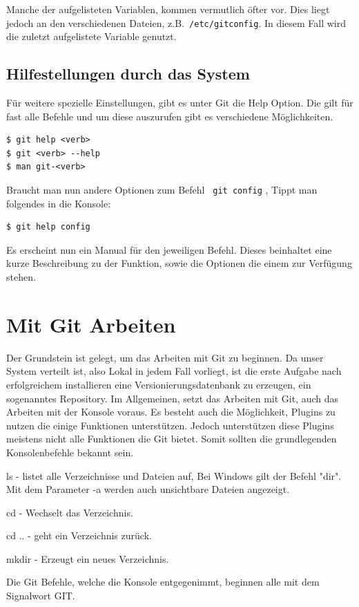 \documentclass[12pt,a4paper,bibliography=totocnumbered,listof=totocnumbered]{scrartcl}
\begin{document}
Manche der aufgelisteten Variablen, kommen vermutlich öfter vor. Dies liegt jedoch an den verschiedenen Dateien, z.B.\lstinline| /etc/gitconfig|. In diesem Fall wird die zuletzt aufgelistete Variable genutzt.

\subsection{Hilfestellungen durch das System}
Für weitere spezielle Einstellungen, gibt es unter Git die Help Option.
Die gilt für fast alle Befehle und um diese auszurufen gibt es verschiedene Möglichkeiten.
\begin{lstlisting}
$ git help <verb>
$ git <verb> --help
$ man git-<verb>
\end{lstlisting} 

Braucht man nun andere Optionen zum Befehl \lstinline| git config| , Tippt man folgendes in die Konsole: 
\begin{lstlisting}
$ git help config
\end{lstlisting}
Es erscheint nun ein Manual für den jeweiligen Befehl. Dieses beinhaltet eine kurze Beschreibung zu der Funktion, sowie die Optionen die einem zur Verfügung stehen.  
  


\section{Mit Git Arbeiten }

Der Grundstein ist gelegt, um das Arbeiten mit Git zu beginnen. Da unser System verteilt ist, also Lokal in jedem Fall vorliegt, ist die erste Aufgabe nach erfolgreichem installieren eine Versionierungsdatenbank zu erzeugen, ein sogenanntes Repository. Im Allgemeinen, setzt das Arbeiten mit Git, auch das Arbeiten mit der Konsole voraus. Es besteht auch die Möglichkeit, Plugins zu nutzen die einige Funktionen unterstützen. Jedoch unterstützen diese Plugins meistens nicht alle Funktionen die Git bietet. Somit sollten die grundlegenden Konsolenbefehle bekannt sein.  
\begin{compactitem}
	\item ls - listet alle Verzeichnisse und Dateien auf, Bei Windows gilt der Befehl "dir". Mit dem Parameter -a werden auch unsichtbare Dateien angezeigt. 
	\item cd - Wechselt das Verzeichnis.
	\item cd .. - geht ein Verzeichnis zurück.
	\item mkdir - Erzeugt ein neues Verzeichnis. 
\end{compactitem}
Die Git Befehle, welche die Konsole entgegenimmt, beginnen alle mit dem Signalwort GIT.  
 
\end{document}
